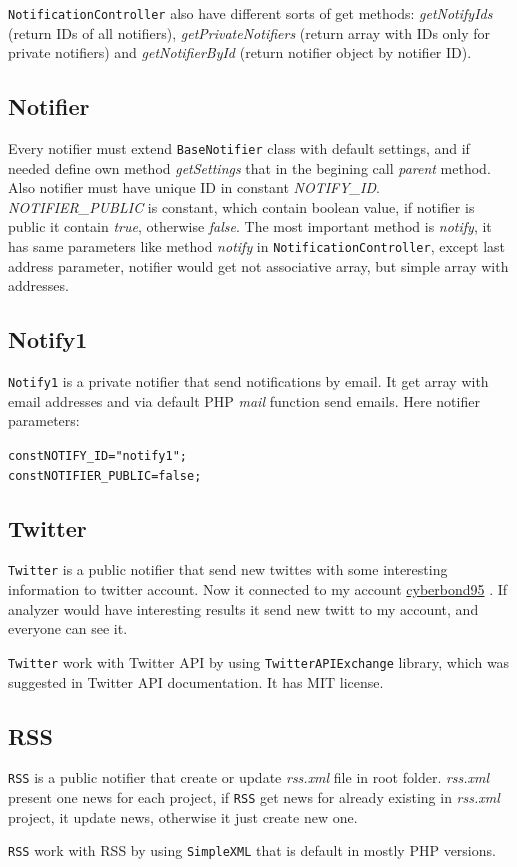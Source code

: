 \texttt{NotificationController} also have different sorts of get methods: \emph{getNotifyIds} (return IDs of all notifiers), \emph{getPrivateNotifiers} (return array with IDs only for private notifiers) and \emph{getNotifierById} (return notifier object by notifier ID).

\subsection{Notifier}

Every notifier must extend \texttt{BaseNotifier} class with default settings, and if needed define own method \emph{getSettings} that in the begining call \emph{parent} method. Also notifier must have unique ID in constant \emph{NOTIFY\_ID}. \emph{NOTIFIER\_PUBLIC} is constant, which contain boolean value, if notifier is public it contain \emph{true}, otherwise \emph{false}. The most important method is \emph{notify}, it has same parameters like method \emph{notify} in \texttt{NotificationController}, except last address parameter, notifier would get not associative array, but simple array with addresses.

\subsection{Notify1}

\texttt{Notify1} is a private notifier that send notifications by email. It get array with email addresses and via default PHP \emph{mail} function send emails. Here notifier parameters:

\begin{alltt}
const NOTIFY_ID = "notify1";
const NOTIFIER_PUBLIC = false;
\end{alltt}

\subsection{Twitter}

\texttt{Twitter} is a public notifier that send new twittes with some interesting information to twitter account. Now it connected to my account \href{https://twitter.com/cyberbond95}{cyberbond95} . If analyzer would have interesting results it send new twitt to my account, and everyone can see it.

\texttt{Twitter} work with Twitter API by using \texttt{TwitterAPIExchange} library, which was suggested in Twitter API documentation. It has MIT license.

\subsection{RSS}

\texttt{RSS} is a public notifier that create or update \emph{rss.xml} file in root folder. \emph{rss.xml} present one news for each project, if \texttt{RSS} get news for already existing in \emph{rss.xml} project, it update news, otherwise it just create new one.

\texttt{RSS} work with RSS by using \texttt{SimpleXML} that is default in mostly PHP versions.

